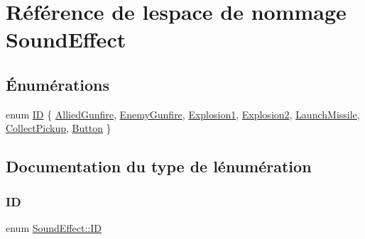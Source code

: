 \hypertarget{namespace_sound_effect}{}\section{Référence de l\textquotesingle{}espace de nommage Sound\+Effect}
\label{namespace_sound_effect}
\subsection*{Énumérations}
\begin{DoxyCompactItemize}
\item 
enum \hyperlink{namespace_sound_effect_a11ffbf1eb89e85a34cbfd5a59b2cd9cb}{ID} \{ \newline
\hyperlink{namespace_sound_effect_a11ffbf1eb89e85a34cbfd5a59b2cd9cba2de2c3b1bde0c6680332ad6a4a7be23d}{Allied\+Gunfire}, 
\hyperlink{namespace_sound_effect_a11ffbf1eb89e85a34cbfd5a59b2cd9cba542febf0b2235d2c76b1e439e54ec504}{Enemy\+Gunfire}, 
\hyperlink{namespace_sound_effect_a11ffbf1eb89e85a34cbfd5a59b2cd9cba754dc9551eff299dfeb39ac06cefef0e}{Explosion1}, 
\hyperlink{namespace_sound_effect_a11ffbf1eb89e85a34cbfd5a59b2cd9cbacc10c90cad7e93053d414d16618d53e9}{Explosion2}, 
\newline
\hyperlink{namespace_sound_effect_a11ffbf1eb89e85a34cbfd5a59b2cd9cba8db0f3afc39d3437b69988875eefc948}{Launch\+Missile}, 
\hyperlink{namespace_sound_effect_a11ffbf1eb89e85a34cbfd5a59b2cd9cba01ec2dffd9dc80a139c6cd6424feca93}{Collect\+Pickup}, 
\hyperlink{namespace_sound_effect_a11ffbf1eb89e85a34cbfd5a59b2cd9cba60f30801017847203cbdb165a9d1713b}{Button}
 \}
\end{DoxyCompactItemize}


\subsection{Documentation du type de l\textquotesingle{}énumération}
\hypertarget{namespace_sound_effect_a11ffbf1eb89e85a34cbfd5a59b2cd9cb}{}\label{namespace_sound_effect_a11ffbf1eb89e85a34cbfd5a59b2cd9cb} 
\subsubsection{\texorpdfstring{ID}{ID}}
{\footnotesize\ttfamily enum \hyperlink{namespace_sound_effect_a11ffbf1eb89e85a34cbfd5a59b2cd9cb}{Sound\+Effect\+::\+ID}}

